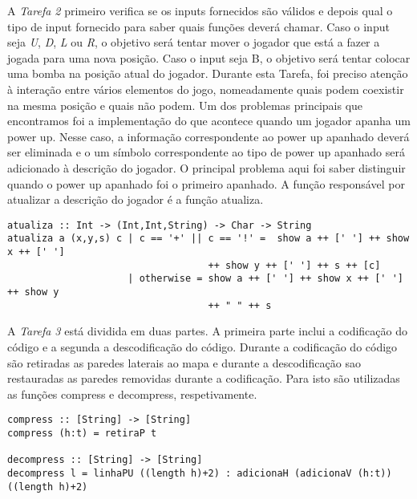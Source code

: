 \documentclass[a4paper]{article}
\begin{document}
A \emph{Tarefa 2} primeiro verifica se os inputs fornecidos são válidos
e depois qual o tipo de input fornecido para saber quais funções deverá
chamar. Caso o input seja \emph{U}, \emph{D}, \emph{L} ou \emph{R}, o
objetivo será tentar mover o jogador que está a fazer a jogada para 
uma nova posição. Caso o input seja B, o objetivo será tentar colocar 
uma bomba na posição atual do jogador. Durante esta Tarefa, foi preciso 
atenção à interação entre vários elementos do jogo, nomeadamente quais 
podem coexistir na mesma posição e quais não podem. Um dos problemas 
principais que encontramos foi a implementação do que acontece quando
um jogador apanha um power up. Nesse caso, a informação correspondente
ao power up apanhado deverá ser eliminada e o um símbolo correspondente 
ao tipo de power up apanhado será adicionado à descrição do jogador. 
O principal problema aqui foi saber distinguir quando o power up 
apanhado foi o primeiro apanhado. A função responsável por atualizar 
a descrição do jogador é a função atualiza.
\begin{verbatim}
atualiza :: Int -> (Int,Int,String) -> Char -> String
atualiza a (x,y,s) c | c == '+' || c == '!' =  show a ++ [' '] ++ show x ++ [' '] 
                                   ++ show y ++ [' '] ++ s ++ [c]  
                     | otherwise = show a ++ [' '] ++ show x ++ [' '] ++ show y 
                                   ++ " " ++ s
\end{verbatim}

A \emph{Tarefa 3} está dividida em duas partes. A primeira parte inclui
a codificação do código e a segunda a descodificação do código. 
Durante a codificação do código são retiradas as paredes laterais
ao mapa e durante a descodificação sao restauradas as paredes removidas
durante a codificação. Para isto são utilizadas as funções compress 
e decompress, respetivamente.
\begin{verbatim}
compress :: [String] -> [String]
compress (h:t) = retiraP t

decompress :: [String] -> [String]
decompress l = linhaPU ((length h)+2) : adicionaH (adicionaV (h:t)) ((length h)+2) 
\end{verbatim}
\end{document}
